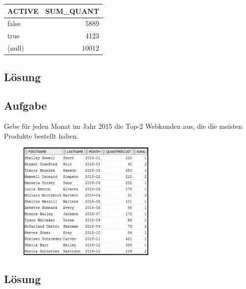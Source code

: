 \begin{table}[H]
  \centering
  \ttfamily
  \begin{tabular}{|l|r|}
    \hline
    \textbf{ACTIVE} & \textbf{SUM\_QUANT} \\
    \hline
    false           & 5889                \\
    true            & 4123                \\
    (null)          & 10012               \\
    \hline
  \end{tabular}
\end{table}

\subsection*{Lösung}
\label{sec:uebung_10.aufgabe_03.loesung}


\subsection{Aufgabe}
\label{sec:uebung_10.aufgabe_04}
Gebe für jeden Monat im Jahr 2015 die Top-2 Webkunden aus, die die meisten Produkte bestellt haben.

\begin{figure}[H]
  \centering
  \includegraphics[width=0.6\textwidth]{img//uebung_10_-_aufgabe_04.png}
  \label{img:uebung_10_-_aufgabe_04}
\end{figure}

\subsection*{Lösung}
\label{sec:uebung_10.aufgabe_04.loesung}


